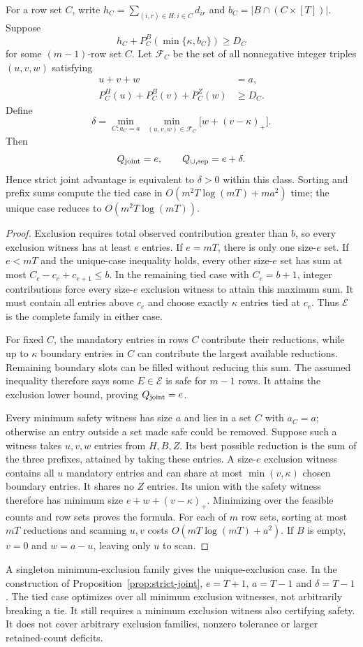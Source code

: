 \begin{proposition}
\label{prop:compatibility}
For a row set $C$, write $h_C=\sum_{(i,r)\in H:i\in C}d_{ir}$ and $b_C=|B\cap(C\times[T])|$. Suppose
\[
 h_C+P_C^B(\min\{\kappa,b_C\})\ge D_C
\]
for some $(m-1)$-row set $C$. Let $\mathcal F_C$ be the set of all nonnegative integer triples $(u,v,w)$ satisfying
\[
 \begin{aligned}
 u+v+w&=a,\\
 P_C^H(u)+P_C^B(v)+P_C^Z(w)&\ge D_C.
 \end{aligned}
\]
Define
\[
 \delta=\min_{C:a_C=a}\ \min_{(u,v,w)\in\mathcal F_C}
       \bigl[w+(v-\kappa)_+\bigr].
\]
Then
\[
 Q_{\rm joint}=e,\qquad Q_{\cup,\rm sep}=e+\delta.
\]
Hence strict joint advantage is equivalent to $\delta>0$ within this class. Sorting and prefix sums compute the tied case in $O(m^2T\log(mT)+ma^2)$ time; the unique case reduces to $O(m^2T\log(mT))$.
\end{proposition}
\begin{proof}
Exclusion requires total observed contribution greater than $b$, so every exclusion witness has at least $e$ entries. If $e=mT$, there is only one size-$e$ set. If $e<mT$ and the unique-case inequality holds, every other size-$e$ set has sum at most $C_e-c_e+c_{e+1}\le b$. In the remaining tied case with $C_e=b+1$, integer contributions force every size-$e$ exclusion witness to attain this maximum sum. It must contain all entries above $c_e$ and choose exactly $\kappa$ entries tied at $c_e$. Thus $\mathcal E$ is the complete family in either case.

For fixed $C$, the mandatory entries in rows $C$ contribute their reductions, while up to $\kappa$ boundary entries in $C$ can contribute the largest available reductions. Remaining boundary slots can be filled without reducing this sum. The assumed inequality therefore says some $E\in\mathcal E$ is safe for $m-1$ rows. It attains the exclusion lower bound, proving $Q_{\rm joint}=e$.

Every minimum safety witness has size $a$ and lies in a set $C$ with $a_C=a$; otherwise an entry outside a set made safe could be removed. Suppose such a witness takes $u,v,w$ entries from $H,B,Z$. Its best possible reduction is the sum of the three prefixes, attained by taking these entries. A size-$e$ exclusion witness contains all $u$ mandatory entries and can share at most $\min(v,\kappa)$ chosen boundary entries. It shares no $Z$ entries. Its union with the safety witness therefore has minimum size $e+w+(v-\kappa)_+$. Minimizing over the feasible counts and row sets proves the formula. For each of $m$ row sets, sorting at most $mT$ reductions and scanning $u,v$ costs $O(mT\log(mT)+a^2)$. If $B$ is empty, $v=0$ and $w=a-u$, leaving only $u$ to scan.
\end{proof}
A singleton minimum-exclusion family gives the unique-exclusion case. In the construction of Proposition~\ref{prop:strict-joint}, $e=T+1$, $a=T-1$ and $\delta=T-1$. The tied case optimizes over all minimum exclusion witnesses, not arbitrarily breaking a tie. It still requires a minimum exclusion witness also certifying safety. It does not cover arbitrary exclusion families, nonzero tolerance or larger retained-count deficits.



